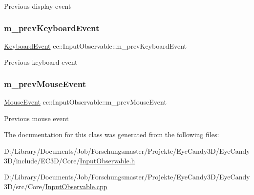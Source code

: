 Previous display event \mbox{\label{classec_1_1_input_observable_acf14cdeb5a394fbd296ff3dfb391c14f}} 
\subsubsection{\texorpdfstring{m\+\_\+prev\+Keyboard\+Event}{m\_prevKeyboardEvent}}
{\footnotesize\ttfamily \mbox{\hyperlink{structec_1_1_keyboard_event}{Keyboard\+Event}} ec\+::\+Input\+Observable\+::m\+\_\+prev\+Keyboard\+Event\hspace{0.3cm}{\ttfamily [protected]}}

Previous keyboard event \mbox{\label{classec_1_1_input_observable_a99e8c1484fe87503096e681d8bd3b75f}} 
\subsubsection{\texorpdfstring{m\+\_\+prev\+Mouse\+Event}{m\_prevMouseEvent}}
{\footnotesize\ttfamily \mbox{\hyperlink{structec_1_1_mouse_event}{Mouse\+Event}} ec\+::\+Input\+Observable\+::m\+\_\+prev\+Mouse\+Event\hspace{0.3cm}{\ttfamily [protected]}}

Previous mouse event 

The documentation for this class was generated from the following files\+:\begin{DoxyCompactItemize}
\item 
D\+:/\+Library/\+Documents/\+Job/\+Forschungsmaster/\+Projekte/\+Eye\+Candy3\+D/\+Eye\+Candy3\+D/include/\+E\+C3\+D/\+Core/\mbox{\hyperlink{_input_observable_8h}{Input\+Observable.\+h}}\item 
D\+:/\+Library/\+Documents/\+Job/\+Forschungsmaster/\+Projekte/\+Eye\+Candy3\+D/\+Eye\+Candy3\+D/src/\+Core/\mbox{\hyperlink{_input_observable_8cpp}{Input\+Observable.\+cpp}}\end{DoxyCompactItemize}
